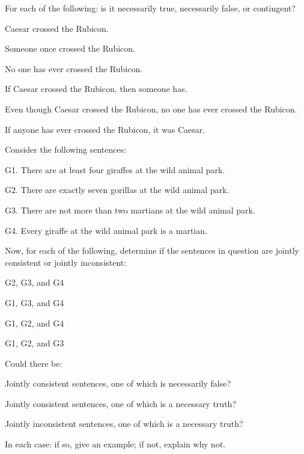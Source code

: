 \practiceproblems
\problempart
\label{pr.EnglishTautology}
For each of the following: is it necessarily true, necessarily false, or contingent?
\begin{earg}
\item Caesar crossed the Rubicon.
\item Someone once crossed the Rubicon.
\item No one has ever crossed the Rubicon.
\item If Caesar crossed the Rubicon, then someone has.
\item Even though Caesar crossed the Rubicon, no one has ever crossed the Rubicon.
\item If anyone has ever crossed the Rubicon, it was Caesar.
\end{earg}

\problempart
\label{pr.MartianGiraffes}
Consider the following sentences:

	\begin{ebullet}
		\item[G1.] There are at least four giraffes at the wild animal park.
		\item[G2.] There are exactly seven gorillas at the wild animal park.
		\item[G3.] There are not more than two martians at the wild animal park.
		\item[G4.] Every giraffe at the wild animal park is a martian.
	\end{ebullet}
	
Now, for each of the following, determine if the sentences in question are jointly consistent or jointly inconsistent:

\begin{earg}
\item G2, G3, and G4
\item G1, G3, and G4
\item G1, G2, and G4
\item G1, G2, and G3
\end{earg}


\problempart
Could there be:
	\begin{earg}
		\item Jointly consistent sentences, one of which is necessarily false?
		\item Jointly consistent sentences, one of which is a necessary truth?
		\item Jointly inconsistent sentences, one of which is a necessary truth?
	\end{earg}
In each case: if so, give an example; if not, explain why not.




